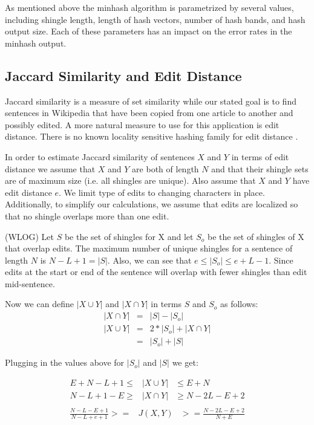 \documentclass{acm_proc_article-sp}
\begin{document}
As mentioned above the minhash algorithm is parametrized by several values, including shingle length, length of hash vectors, number of hash bands, and hash output size. Each of these parameters has an impact on the error rates in the minhash output. 

\subsection{Jaccard Similarity and Edit Distance}

Jaccard similarity is a measure of set similarity while our stated goal is to find sentences in Wikipedia that have been copied from one article to another and possibly edited. A more natural measure to use for this application is edit distance. There is no known locality sensitive hashing family for edit distance \citation{}.

In order to estimate Jaccard similarity of sentences $X$ and $Y$ in terms of edit distance we assume that $X$ and $Y$ are both of length $N$ and that their shingle sets are of maximum size (i.e. all shingles are unique). Also assume that $X$ and $Y$ have edit distance $e$.  We limit type of edits to changing characters in place. Additionally, to simplify our calculations, we assume that edits are localized so that no shingle overlaps more than one edit.

(WLOG) Let $S$ be the set of shingles for X and let $S_o$ be the set of shingles of X that overlap edits. The maximum number of unique shingles for a sentence of length $N$ is $N - L + 1 = |S|$. Also, we can see that $e \le |S_o| \le e + L - 1$. Since edits at the start or end of the sentence will overlap with fewer shingles than edit mid-sentence.

Now we can define $|X \cup Y|$ and $|X \cap Y|$ in terms $S$ and $S_o$ as follows:
\begin{eqnarray*}
|X \cap Y| & = & |S| - |S_o| \\
|X \cup Y| & = & 2*|S_o| + |X \cap Y| \\
           & = & |S_o| + |S|
\end{eqnarray*}

Plugging in the values above for $|S_o|$ and $|S|$ we get:

\begin{eqnarray*}
E + N - L + 1  \le & |X \cup Y| & \le E + N \\
N - L + 1 - E  \ge & |X \cap Y| & \ge N - 2L - E + 2 \\
\end{eqnarray*}
\begin{eqnarray*}
\frac{N - L - E + 1 }{N - L + e + 1} >= & J(X,Y) & >= \frac{N - 2L - E + 2}{N + E}
\end{eqnarray*}
\end{document}
